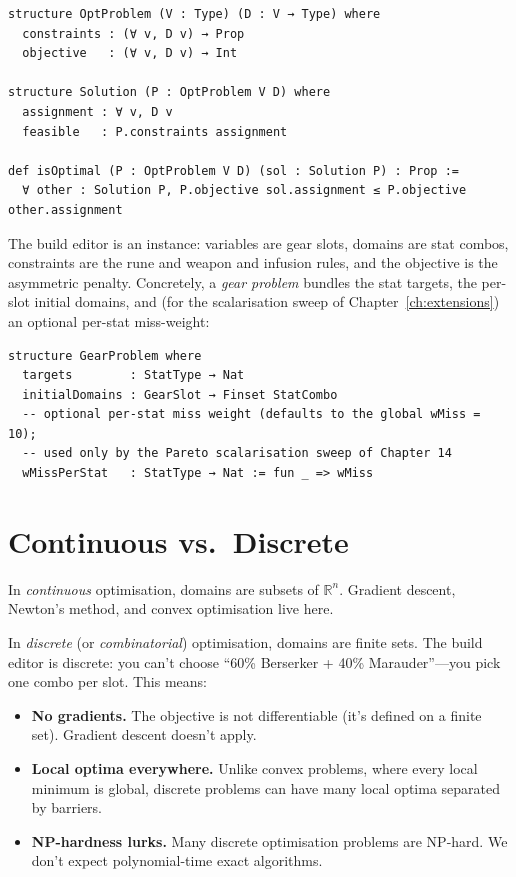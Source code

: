 \documentclass[11pt, a4paper, oneside]{book}
\newcommand{\R}{\mathbb{R}}
\begin{document}
\begin{leanbox}[title={Lean 4 --- OptProblem}]
\begin{verbatim}
structure OptProblem (V : Type) (D : V → Type) where
  constraints : (∀ v, D v) → Prop
  objective   : (∀ v, D v) → Int

structure Solution (P : OptProblem V D) where
  assignment : ∀ v, D v
  feasible   : P.constraints assignment

def isOptimal (P : OptProblem V D) (sol : Solution P) : Prop :=
  ∀ other : Solution P, P.objective sol.assignment ≤ P.objective other.assignment
\end{verbatim}
\end{leanbox}

The build editor is an instance: variables are gear slots, domains are
stat combos, constraints are the rune and weapon and infusion rules, and
the objective is the asymmetric penalty.  Concretely, a \emph{gear problem}
bundles the stat targets, the per-slot initial domains, and (for the
scalarisation sweep of Chapter~\ref{ch:extensions}) an optional per-stat
miss-weight:

\begin{leanbox}[title={Lean 4 (Mathlib) --- GearProblem}]
\begin{verbatim}
structure GearProblem where
  targets        : StatType → Nat
  initialDomains : GearSlot → Finset StatCombo
  -- optional per-stat miss weight (defaults to the global wMiss = 10);
  -- used only by the Pareto scalarisation sweep of Chapter 14
  wMissPerStat   : StatType → Nat := fun _ => wMiss
\end{verbatim}
\end{leanbox}

\section{Continuous vs.\ Discrete}

In \emph{continuous} optimisation, domains are subsets of $\R^n$.  Gradient
descent, Newton's method, and convex optimisation live here.

In \emph{discrete} (or \emph{combinatorial}) optimisation, domains are finite
sets.  The build editor is discrete: you can't choose ``60\% Berserker +
40\% Marauder''---you pick one combo per slot.  This means:

\begin{itemize}[nosep]
  \item \textbf{No gradients.}  The objective is not differentiable (it's
    defined on a finite set).  Gradient descent doesn't apply.
  \item \textbf{Local optima everywhere.}  Unlike convex problems, where every
    local minimum is global, discrete problems can have many local optima
    separated by barriers.
  \item \textbf{NP-hardness lurks.}  Many discrete optimisation problems are
    NP-hard.  We don't expect polynomial-time exact algorithms.
\end{itemize}
\end{document}
